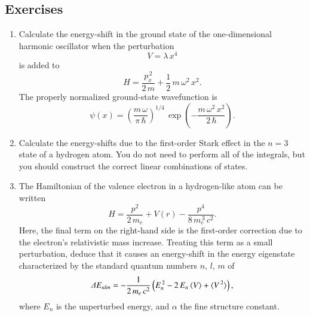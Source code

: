 \subsection*{Exercises}
\begin{enumerate}[label=\thechapter.\arabic*,leftmargin=*,widest=9.20]
\item Calculate the energy-shift in the ground state of the one-dimensional harmonic
oscillator when the perturbation
$$
V = \lambda\,x^4
$$
is added to
$$
H = \frac{p_x^{\,2}}{2\,m} + \frac{1}{2}\,m\,\omega^2\,x^2.
$$
The properly normalized ground-state wavefunction is 
$$
\psi(x) = \left(\frac{m\,\omega}{\pi\,\hbar}\right)^{1/4}\,\exp\left(-\frac{m\,\omega^2\,x^2}{2\,\hbar}\right).
$$

\item Calculate the energy-shifts due to the first-order Stark effect in the $n=3$ state of a hydrogen atom. You do not
need to perform all of the integrals, but you should construct the correct linear combinations of states. 

\item The Hamiltonian of the valence electron in a hydrogen-like atom can be written\label{ex7.1}
$$
H = \frac{p^2}{2\,m_e} + V(r) - \frac{p^4}{8\,m_e^{\,3}\,c^2}.
$$
Here, the final term on the right-hand side is the first-order correction due to the electron's relativistic mass
increase. Treating this term as a small perturbation, deduce that it causes an energy-shift in the energy eigenstate
characterized by the standard quantum numbers $n$, $l$, $m$ of
$$
{\mit\Delta}E_{nlm} = -\frac{1}{2\,m_e\,c^2}\left(E_n^{\,2} - 2\,E_n\,\langle V\rangle + \langle V^{\,2}\rangle\right),
$$
where $E_n$ is the unperturbed energy, and $\alpha$ the fine structure constant. 


\end{enumerate}
